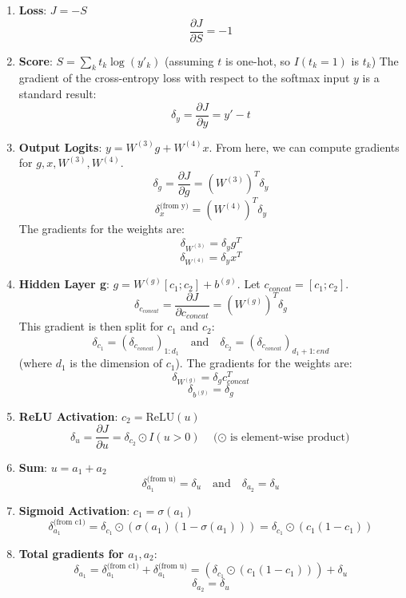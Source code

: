 \documentclass{article}
\begin{document}
\begin{enumerate}
    \item \textbf{Loss}: $J = -S$
    \[ \frac{\partial J}{\partial S} = -1 \]

    \item \textbf{Score}: $S = \sum_{k} t_k \log(y'_k)$ (assuming $t$ is one-hot, so $I(t_k=1)$ is $t_k$)
    The gradient of the cross-entropy loss with respect to the softmax input $y$ is a standard result:
    \[ \delta_y = \frac{\partial J}{\partial y} = y' - t \]

    \item \textbf{Output Logits}: $y = W^{(3)}g + W^{(4)}x$. From here, we can compute gradients for $g, x, W^{(3)}, W^{(4)}$.
    \[ \delta_g = \frac{\partial J}{\partial g} = (W^{(3)})^T \delta_y \]
    \[ \delta_x^{\text{(from y)}} = (W^{(4)})^T \delta_y \]
    The gradients for the weights are:
    \[ \delta_{W^{(3)}} = \delta_y g^T \]
    \[ \delta_{W^{(4)}} = \delta_y x^T \]

    \item \textbf{Hidden Layer g}: $g = W^{(g)}[c_1; c_2] + b^{(g)}$. Let $c_{concat} = [c_1; c_2]$.
    \[ \delta_{c_{concat}} = \frac{\partial J}{\partial c_{concat}} = (W^{(g)})^T \delta_g \]
    This gradient is then split for $c_1$ and $c_2$:
    \[ \delta_{c_1} = (\delta_{c_{concat}})_{1:d_1} \quad \text{and} \quad \delta_{c_2} = (\delta_{c_{concat}})_{d_1+1:end} \]
    (where $d_1$ is the dimension of $c_1$).
    The gradients for the weights are:
    \[ \delta_{W^{(g)}} = \delta_g c_{concat}^T \]
    \[ \delta_{b^{(g)}} = \delta_g \]

    \item \textbf{ReLU Activation}: $c_2 = \text{ReLU}(u)$
    \[ \delta_u = \frac{\partial J}{\partial u} = \delta_{c_2} \odot I(u > 0) \quad \text{($\odot$ is element-wise product)} \]

    \item \textbf{Sum}: $u = a_1 + a_2$
    \[ \delta_{a_1}^{\text{(from u)}} = \delta_u \quad \text{and} \quad \delta_{a_2} = \delta_u \]

    \item \textbf{Sigmoid Activation}: $c_1 = \sigma(a_1)$
    \[ \delta_{a_1}^{\text{(from c1)}} = \delta_{c_1} \odot (\sigma(a_1)(1-\sigma(a_1))) = \delta_{c_1} \odot (c_1(1-c_1)) \]

    \item \textbf{Total gradients for $a_1, a_2$}:
    \[ \delta_{a_1} = \delta_{a_1}^{\text{(from c1)}} + \delta_{a_1}^{\text{(from u)}} = (\delta_{c_1} \odot (c_1(1-c_1))) + \delta_u \]
    \[ \delta_{a_2} = \delta_u \]


\end{enumerate}
\end{document}
